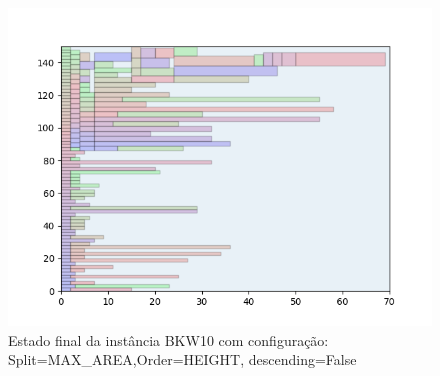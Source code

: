 \begin{figure}[H]
    \centering
    \caption[]{Estado final da instância BKW10 com configuração: Split=MAX_AREA,Order=HEIGHT, descending=False}
    \label{fig:bkw10-max_area-height-false}
    \includegraphics[scale=0.5]{output/figures/bkw/bkw10/max_area/height/false/000}
\end{figure}